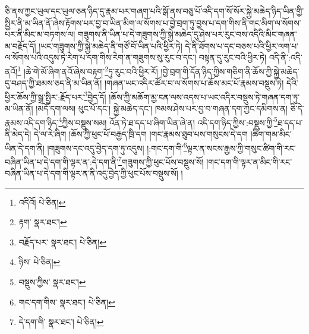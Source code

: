 ཅི་ནས་ཀྱང་ཡུལ་དང་ཡུལ་ཅན་ཉིད་དུ་རྣམ་པར་གཞག་པའི་སྒོ་ནས་བཅུ་པོ་འདི་དག་སོ་སོར་སྐྱེ་མཆེད་ཉིད་ཡིན་གྱི་སྤྱིར་ནི་མ་ཡིན་ནོ་ཞེས་རྟོགས་པར་བྱ་བ་ཡིན་མིག་ལ་སོགས་པ་བྱེ་བྲག་ཏུ་བྱས་པ་དག་གིས་ནི་གང་མིག་ལ་སོགས་པར་ནི་མིང་མ་བཏགས་ལ། གཟུགས་ནི་ཡིན་པ་དེ་གཟུགས་ཀྱི་སྐྱེ་མཆེད་དུ་ཤེས་པར་རུང་བས་འདིའི་མིང་གཞན་མ་བརྗོད་དོ། །ཡང་གཟུགས་ཀྱི་སྐྱེ་མཆེད་ནི་གཙོ་བོ་ཡིན་པའི་ཕྱིར་ཏེ། དེ་ནི་ཐོགས་པ་དང་བཅས་པའི་ཕྱིར་ལག་པ་ལ་སོགས་པའི་འདུས་ཏེ་རེག་པ་དག་གིས་རེག་ན་གཟུགས་སུ་རུང་བ་དང་། བསྟན་དུ་རུང་བའི་ཕྱིར་ཏེ། འདི་ནི་:འདི་ནའོ།\footnote{འདིའོ།  པེ་ཅིན། } །ཆེ་གེ་མོ་ཞིག་ནའོ་ཞེས་བརྟག་\footnote{རྟག་  སྣར་ཐང་། }ཏུ་རུང་བའི་ཕྱིར་རོ། །བྱེ་བྲག་གི་དོན་ཉིད་ཀྱིས་གཅིག་ནི་ཆོས་ཀྱི་སྐྱེ་མཆེད་དུ་བཤད་ཀྱི་ཐམས་ཅད་ནི་མ་ཡིན་ནོ། །གཞན་ཡང་འདིར་ཚོར་བ་ལ་སོགས་པ་ཆོས་མང་པོ་རྣམས་བསྡུས་ཏེ། དེའི་ཕྱིར་ཆོས་ཀྱི་སྒྲ་སྤྱིར་:རྗོད་པར་\footnote{བརྗོད་པར་  སྣར་ཐང་།  པེ་ཅིན། }བྱེད་དོ། །ཆོས་ཀྱི་མཆོག་མྱ་ངན་ལས་འདས་པ་ཡང་འདིར་བསྡུས་ཏེ་གཞན་དག་ཏུ་མ་ཡིན་ནོ། །མདོ་དག་ལས། ཕུང་པོ་དང་། སྐྱེ་མཆེད་དང་། ཁམས་ཤེས་པར་བྱ་བ་གཞན་དག་ཀྱང་དམིགས་ན། ཅི་དེ་རྣམས་འདི་དག་ཉིད་\footnote{ཉིས་  པེ་ཅིན། }ཀྱིས་བསྡུས་སམ། འོན་ཏེ་ཐ་དད་པ་ཞིག་ཡིན་ཞེ་ན། འདི་དག་ཉིད་ཀྱིས་:བསྡུས་ཀྱི་\footnote{བསྡུས་ཀྱིས་  སྣར་ཐང་། }ཐ་དད་པ་ནི་མེད་དེ། དེ་ལ་རེ་ཞིག །ཆོས་ཀྱི་ཕུང་པོ་བརྒྱད་ཁྲི་དག །གང་རྣམས་ཐུབ་པས་གསུངས་དེ་དག །ཚིག་གམ་མིང་ཡིན་དེ་དག་ནི། །གཟུགས་དང་འདུ་བྱེད་དག་ཏུ་འདུས། །:གང་དག་གི་\footnote{གང་དག་གིས་  སྣར་ཐང་།  པེ་ཅིན། }ལྟར་ན་སངས་རྒྱས་ཀྱི་གསུང་ཚིག་གི་རང་བཞིན་ཡིན་པ་དེ་དག་གི་ལྟར་ན་:དེ་དག་ནི་\footnote{དེ་དག་གི་  སྣར་ཐང་།  པེ་ཅིན། }གཟུགས་ཀྱི་ཕུང་པོས་བསྡུས་སོ། །གང་དག་གི་ལྟར་ན་མིང་གི་རང་བཞིན་ཡིན་པ་དེ་དག་གི་ལྟར་ན་ནི་འདུ་བྱེད་ཀྱི་ཕུང་པོས་བསྡུས་སོ། །
